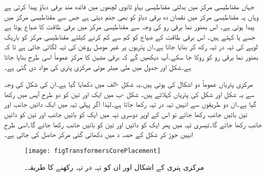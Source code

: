 جہاں مقناطیسی مرکز میں بدلتی مقناطیسی بہاو ثانوی لچھوں میں فائدہ مند برقی دباؤ پیدا کرتی ہے وہاں یہ مقناطیسی مرکز میں نقصان دہ برقی دباؤ کو بھی جنم دیتی ہے جس سے مقناطیسی مرکز میں  پیدا ہوتی ہے۔ اس بھنور نما برقی رو کی وجہ سے مقناطیسی مرکز میں برقی طاقت کا ضیاع ہوتا ہے جسے   یا  کہتے ہیں۔ اس برقی طاقت  کے ضیاع کو کم سے کم کرنے کیلئے مقناطیسی مرکز کو  باریک لوہے کی  تہہ در تہہ رکھ کر بنایا جاتا ہے۔ان پتریوں پر غیر موصل روغن کی تہہ لگائی جاتی ہے تا کہ بھنور نما برقی رو کو روکا جا سکے۔آپ دیکھیں گے کہ برقی مشین کا مرکز عموماً اسی طرح بنایا جاتا ہے۔شکل  اور جدول   میں  ملی میٹر موٹی  مرکزی پتری کی  مواد دی گئی ہے۔

مرکزی پتریاں عموماً دو اشکال کی ہوتی ہیں۔یہ شکل -الف میں دکھایا گیا ہے۔ان کی شکل کی وجہ سے یہ  شکل اور  شکل کی پتریاں کہلاتے ہیں۔ شکل -ب میں ایک اور تین  کو دو طرح آپس میں رکھا گیا ہے۔ان دو طریقوں سے انہیں تہہ در تہہ رکھا جاتا ہے۔لہٰذا اگر پہلی تہہ میں ایک دائیں جانب اور تین بائیں جانب رکھا جائے تو اس کے اوپر دوسری تہہ میں ایک کو بائیں جانب اور تین کو دائیں جانب رکھا جائے گا۔تیسری تہہ میں پھر ایک کو دائیں اور تین کو بائیں جانب رکھا جائے گا۔اسی طرح انہیں جوڑ کر شکل کے حصہ د میں دکھائی گئی مرکز حاصل کی جاتی ہے۔

\begin{figure}
\centering
\texttt{[image: figTransformersCorePlacement]}
\caption{مرکزی پتری کے اشکال اور ان کو تہہ در تہہ رکھنے کا طریقہ۔}
\label{شکل_ٹرانسفارم_تہہ_در_تہہ_مرکز}
\end{figure}

